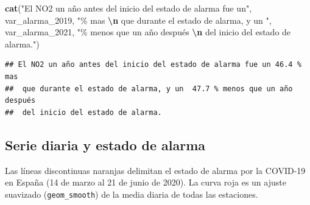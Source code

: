 \documentclass[notspecified,article,submit,oneauthor,pdftex]{Definitions/mdpi}
\newenvironment{Shaded}{\begin{snugshade}}{\end{snugshade}}
\newcommand{\FunctionTok}[1]{\textcolor[rgb]{0.13,0.29,0.53}{\textbf{#1}}}
\newcommand{\NormalTok}[1]{#1}
\newcommand{\SpecialCharTok}[1]{\textcolor[rgb]{0.81,0.36,0.00}{\textbf{#1}}}
\newcommand{\StringTok}[1]{\textcolor[rgb]{0.31,0.60,0.02}{#1}}
\begin{document}
\begin{Shaded}
\begin{Highlighting}[]
\FunctionTok{cat}\NormalTok{(}\StringTok{"El NO2 un año antes del inicio del estado de alarma fue un"}\NormalTok{, var\_alarma\_2019, }\StringTok{"\% mas }\SpecialCharTok{\textbackslash{}n}\StringTok{ que durante el estado de alarma, y un "}\NormalTok{, var\_alarma\_2021, }\StringTok{"\% menos que un año después }\SpecialCharTok{\textbackslash{}n}\StringTok{ del inicio del estado de alarma."}\NormalTok{)}
\end{Highlighting}
\end{Shaded}

\begin{verbatim}
## El NO2 un año antes del inicio del estado de alarma fue un 46.4 % mas 
##  que durante el estado de alarma, y un  47.7 % menos que un año después 
##  del inicio del estado de alarma.
\end{verbatim}

\subsection{Serie diaria y estado de
alarma}\label{serie-diaria-y-estado-de-alarma}

Las líneas discontinuas naranjas delimitan el estado de alarma por la
COVID-19 en España (14 de marzo al 21 de junio de 2020). La curva roja
es un ajuste suavizado (\texttt{geom\_smooth}) de la media diaria de
todas las estaciones.
\end{document}
